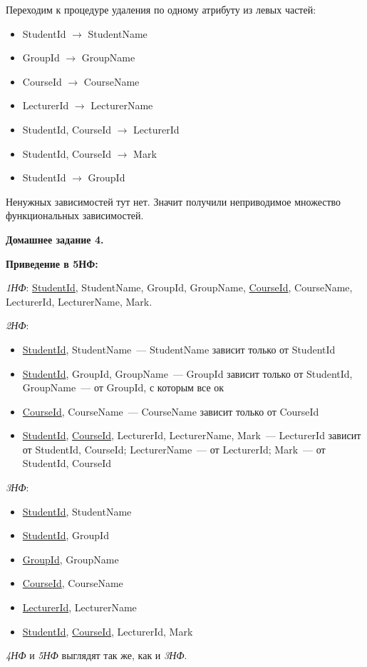 \documentclass[11pt,a4paper,oneside]{article}
\begin{document}
Переходим к процедуре удаления по одному атрибуту из левых частей:

\begin{itemize}
\item StudentId $\rightarrow$ StudentName
\item GroupId $\rightarrow$ GroupName
\item CourseId $\rightarrow$ CourseName
\item LecturerId $\rightarrow$ LecturerName
\item StudentId, CourseId $\rightarrow$ LecturerId
\item StudentId, CourseId $\rightarrow$ Mark
\item StudentId $\rightarrow$ GroupId
\end{itemize}

Ненужных зависимостей тут нет. Значит получили неприводимое множество функциональных зависимостей.
\newline

\begin{LARGE} \textbf{Домашнее задание 4.} \end{LARGE}
\newline

\textbf{Приведение в 5НФ:}

\textit{1НФ}: \underline{StudentId}, StudentName, GroupId, GroupName, \underline{CourseId}, CourseName, LecturerId, LecturerName, Mark.

\textit{2НФ}: 
\begin{itemize}
\item \underline{StudentId}, StudentName~--- StudentName зависит только от StudentId
\item \underline{StudentId}, GroupId, GroupName~--- GroupId зависит только от StudentId, GroupName~--- от GroupId, с которым все ок
\item \underline{CourseId}, CourseName~--- CourseName зависит только от CourseId
\item \underline{StudentId}, \underline{CourseId}, LecturerId, LecturerName, Mark~--- LecturerId зависит от StudentId, CourseId; LecturerName~--- от LecturerId; Mark~--- от StudentId, CourseId
\end{itemize}

\textit{3НФ}:
\begin{itemize}
\item \underline{StudentId}, StudentName
\item \underline{StudentId}, GroupId
\item \underline{GroupId}, GroupName
\item \underline{CourseId}, CourseName
\item \underline{LecturerId}, LecturerName
\item \underline{StudentId}, \underline{CourseId}, LecturerId, Mark
\end{itemize}

\textit{4НФ} и \textit{5НФ} выглядят так же, как и \textit{3НФ}.
\end{document}
